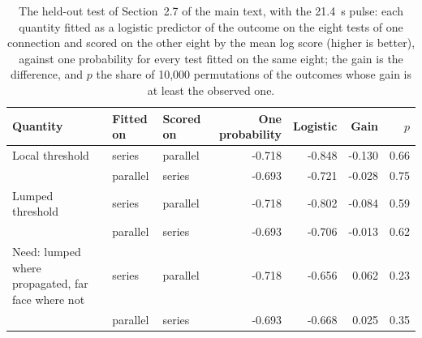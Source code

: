 \begin{table}[!htbp]
\centering
\footnotesize
\caption{The held-out test of Section~2.7 of the main text, with the 21.4~s pulse: each quantity fitted as a logistic predictor of the outcome on the eight tests of one connection and scored on the other eight by the mean log score (higher is better), against one probability for every test fitted on the same eight; the gain is the difference, and $p$ the share of 10,000 permutations of the outcomes whose gain is at least the observed one.}
\label{tab:s-heldout}
\setlength{\tabcolsep}{4pt}
\begin{tabular}{p{}llrrrr}
\toprule
Quantity & Fitted on & Scored on & One probability & Logistic & Gain & $p$ \\
\midrule
Local threshold & series & parallel & -0.718 & -0.848 & -0.130 & 0.66 \\
 & parallel & series & -0.693 & -0.721 & -0.028 & 0.75 \\
Lumped threshold & series & parallel & -0.718 & -0.802 & -0.084 & 0.59 \\
 & parallel & series & -0.693 & -0.706 & -0.013 & 0.62 \\
Need: lumped where propagated, far face where not & series & parallel & -0.718 & -0.656 & 0.062 & 0.23 \\
 & parallel & series & -0.693 & -0.668 & 0.025 & 0.35 \\
\bottomrule
\end{tabular}
\end{table}
